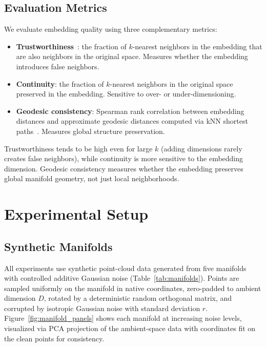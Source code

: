 \documentclass{article}
\begin{document}
\subsection{Evaluation Metrics}

We evaluate embedding quality using three complementary metrics:
\begin{itemize}
    \item \textbf{Trustworthiness}~\citep{venna2001neighborhood}: the fraction of $k$-nearest neighbors in the embedding that are also neighbors in the original space. Measures whether the embedding introduces false neighbors.
    \item \textbf{Continuity}: the fraction of $k$-nearest neighbors in the original space preserved in the embedding. Sensitive to over- or under-dimensioning.
    \item \textbf{Geodesic consistency}: Spearman rank correlation between embedding distances and approximate geodesic distances computed via kNN shortest paths~\citep{tenenbaum2000global}. Measures global structure preservation.
\end{itemize}
Trustworthiness tends to be high even for large $k$ (adding dimensions rarely creates false neighbors), while continuity is more sensitive to the embedding dimension. Geodesic consistency measures whether the embedding preserves global manifold geometry, not just local neighborhoods.

\clearpage
\section{Experimental Setup}
\label{sec:setup}

\subsection{Synthetic Manifolds}

All experiments use synthetic point-cloud data generated from five manifolds with controlled additive Gaussian noise (Table~\ref{tab:manifolds}). Points are sampled uniformly on the manifold in native coordinates, zero-padded to ambient dimension $D$, rotated by a deterministic random orthogonal matrix, and corrupted by isotropic Gaussian noise with standard deviation $r$. Figure~\ref{fig:manifold_panels} shows each manifold at increasing noise levels, visualized via PCA projection of the ambient-space data with coordinates fit on the clean points for consistency.
\end{document}
